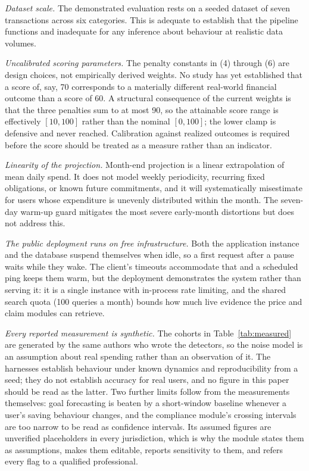 \documentclass[conference]{IEEEtran}
\begin{document}
\emph{Dataset scale.} The demonstrated evaluation rests on a seeded dataset of seven transactions across six categories. This is adequate to establish that the pipeline functions and inadequate for any inference about behaviour at realistic data volumes.

\emph{Uncalibrated scoring parameters.} The penalty constants in (4) through (6) are design choices, not empirically derived weights. No study has yet established that a score of, say, 70 corresponds to a materially different real-world financial outcome than a score of 60. A structural consequence of the current weights is that the three penalties sum to at most 90, so the attainable score range is effectively $[10, 100]$ rather than the nominal $[0, 100]$; the lower clamp is defensive and never reached. Calibration against realized outcomes is required before the score should be treated as a measure rather than an indicator.

\emph{Linearity of the projection.} Month-end projection is a linear extrapolation of mean daily spend. It does not model weekly periodicity, recurring fixed obligations, or known future commitments, and it will systematically misestimate for users whose expenditure is unevenly distributed within the month. The seven-day warm-up guard mitigates the most severe early-month distortions but does not address this.

\emph{The public deployment runs on free infrastructure.} Both the application instance and the database suspend themselves when idle, so a first request after a pause waits while they wake. The client's timeouts accommodate that and a scheduled ping keeps them warm, but the deployment demonstrates the system rather than serving it: it is a single instance with in-process rate limiting, and the shared search quota (100 queries a month) bounds how much live evidence the price and claim modules can retrieve.

\emph{Every reported measurement is synthetic.} The cohorts in Table~\ref{tab:measured} are generated by the same authors who wrote the detectors, so the noise model is an assumption about real spending rather than an observation of it. The harnesses establish behaviour under known dynamics and reproducibility from a seed; they do not establish accuracy for real users, and no figure in this paper should be read as the latter. Two further limits follow from the measurements themselves: goal forecasting is beaten by a short-window baseline whenever a user's saving behaviour changes, and the compliance module's crossing intervals are too narrow to be read as confidence intervals. Its assumed figures are unverified placeholders in every jurisdiction, which is why the module states them as assumptions, makes them editable, reports sensitivity to them, and refers every flag to a qualified professional.
\end{document}
